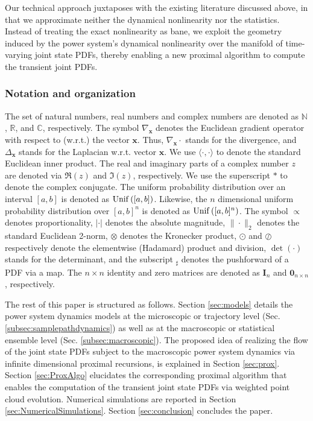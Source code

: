 \documentclass[10pt,twocolumn]{IEEEtran}
\begin{document}
Our technical approach juxtaposes with the existing literature discussed above, in that we approximate neither the dynamical nonlinearity nor the statistics. Instead of treating the exact nonlinearity as bane, we exploit the geometry induced by the power system's dynamical nonlinearity over the manifold of time-varying joint state PDFs, thereby enabling a new proximal algorithm to compute the transient joint PDFs.

\subsubsection{Notation and organization}
The set of natural numbers, real numbers and complex numbers are denoted as $\mathbb{N}$, $\mathbb{R}$, and $\mathbb{C}$, respectively. The symbol $\nabla_{\bm{x}}$ denotes the Euclidean gradient operator with respect to (w.r.t.) the vector $\bm{x}$. Thus, $\nabla_{\bm{x}}\cdot$ stands for the divergence, and $\Delta_{\bm{x}}$ stands for the Laplacian w.r.t. vector $\bm{x}$. We use $\langle\cdot,\cdot\rangle$ to denote the standard Euclidean inner product. The real and imaginary parts of a complex number $z$ are denoted via $\Re(z)$ and $\Im(z)$, respectively. We use the superscript $*$ to denote the complex conjugate. The uniform probability distribution over an interval $[a,b]$ is denoted as ${\rm{Unif}}\left([a,b]\right)$. Likewise, the $n$ dimensional uniform probability distribution over $[a,b]^{n}$ is denoted as ${\rm{Unif}}\left([a,b]^{n}\right)$. The symbol $\propto$ denotes proportionality, $|\cdot|$ denotes the absolute magnitude, $\|\cdot\|_{2}$ denotes the standard Euclidean 2-norm, $\otimes$ denotes the Kronecker product, $\odot$ and $\oslash$ respectively denote the elementwise (Hadamard) product and division, $\det(\cdot)$ stands for the determinant, and the subscript $_{\sharp}$ denotes the pushforward of a PDF via a map. The $n\times n$ identity and zero matrices are denoted as $\bm{I}_{n}$ and $\bm{0}_{n\times n}$, respectively.

The rest of this paper is structured as follows. Section \ref{sec:models} details the power system dynamics models at the microscopic or trajectory level (Sec. \ref{subsec:samplepathdynamics}) as well as at the macroscopic or statistical ensemble level (Sec. \ref{subsec:macroscopic}). The proposed idea of realizing the flow of the joint state PDFs subject to the macroscopic power system dynamics via infinite dimensional proximal recursions, is explained in Section \ref{sec:prox}. Section \ref{sec:ProxAlgo} elucidates the corresponding proximal algorithm that enables the computation of the transient joint state PDFs via weighted point cloud evolution. Numerical simulations are reported in Section \ref{sec:NumericalSimulations}. Section \ref{sec:conclusion} concludes the paper.
\end{document}
